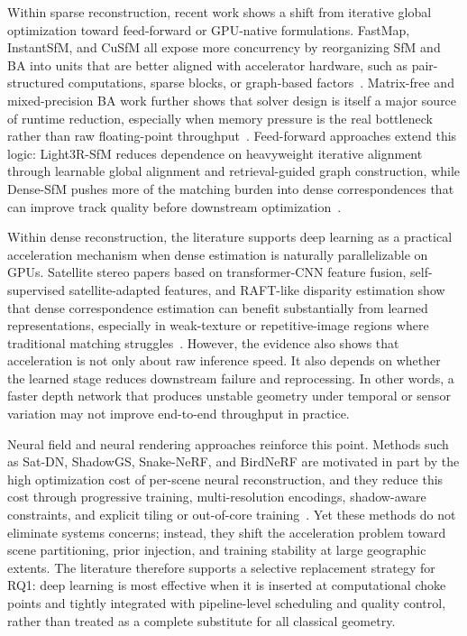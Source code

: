 Within sparse reconstruction, recent work shows a shift from iterative global optimization toward feed-forward or GPU-native formulations. FastMap, InstantSfM, and CuSfM all expose more concurrency by reorganizing SfM and BA into units that are better aligned with accelerator hardware, such as pair-structured computations, sparse blocks, or graph-based factors~\cite{Li2025FastMap,Zhong2025InstantSfM,Yu2025CuSfM}. Matrix-free and mixed-precision BA work further shows that solver design is itself a major source of runtime reduction, especially when memory pressure is the real bottleneck rather than raw floating-point throughput~\cite{Safari2025,Gopinath2025}. Feed-forward approaches extend this logic: Light3R-SfM reduces dependence on heavyweight iterative alignment through learnable global alignment and retrieval-guided graph construction, while Dense-SfM pushes more of the matching burden into dense correspondences that can improve track quality before downstream optimization~\cite{Light3RSfM2025,DenseSfM2025}.

Within dense reconstruction, the literature supports deep learning as a practical acceleration mechanism when dense estimation is naturally parallelizable on GPUs. Satellite stereo papers based on transformer-CNN feature fusion, self-supervised satellite-adapted features, and RAFT-like disparity estimation show that dense correspondence estimation can benefit substantially from learned representations, especially in weak-texture or repetitive-image regions where traditional matching struggles~\cite{Amadei2025,FoundationStereo2025,SatDepth2025}. However, the evidence also shows that acceleration is not only about raw inference speed. It also depends on whether the learned stage reduces downstream failure and reprocessing. In other words, a faster depth network that produces unstable geometry under temporal or sensor variation may not improve end-to-end throughput in practice.

Neural field and neural rendering approaches reinforce this point. Methods such as Sat-DN, ShadowGS, Snake-NeRF, and BirdNeRF are motivated in part by the high optimization cost of per-scene neural reconstruction, and they reduce this cost through progressive training, multi-resolution encodings, shadow-aware constraints, and explicit tiling or out-of-core training~\cite{SatDN2025,ShadowGS2026,SnakeNeRF2025,BirdNeRF2025}. Yet these methods do not eliminate systems concerns; instead, they shift the acceleration problem toward scene partitioning, prior injection, and training stability at large geographic extents. The literature therefore supports a selective replacement strategy for RQ1: deep learning is most effective when it is inserted at computational choke points and tightly integrated with pipeline-level scheduling and quality control, rather than treated as a complete substitute for all classical geometry.

